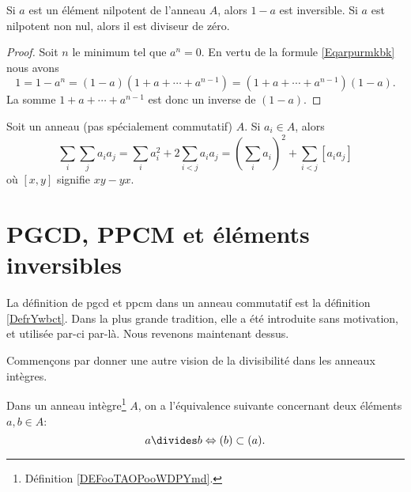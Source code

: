 \begin{proposition}
	Si \( a\) est un élément nilpotent de l'anneau \( A\), alors \( 1-a\) est inversible. Si \( a\) est nilpotent non nul, alors il est diviseur de zéro.
\end{proposition}

\begin{proof}
	Soit \( n\) le minimum tel que \( a^n=0\). En vertu de la formule \eqref{Eqarpurmkbk} nous avons
	\begin{equation}
		1=1-a^n=(1-a)(1+a+\cdots+a^{n-1})=(1+a+\cdots+a^{n-1})(1-a).
	\end{equation}
	La somme \( 1+a+\cdots+a^{n-1}\) est donc un inverse de \( (1-a)\).
\end{proof}

\begin{proposition}	\label{PROPooQMZMooBrQhhr}
	Soit un anneau (pas spécialement commutatif) \( A\). Si \( a_i\in A\), alors
	\begin{equation}
		\sum_i\sum_ja_ia_j=\sum_ia_i^2+2\sum_{i<j}a_ia_j=(\sum_ia_i)^2+\sum_{i<j}[a_ia_j]
	\end{equation}
	où \( [x,y]\) signifie \( xy-yx\).
\end{proposition}


\section{PGCD, PPCM et éléments inversibles}

La définition de pgcd et ppcm dans un anneau commutatif est la définition \ref{DefrYwbct}. Dans la plus grande tradition, elle a été introduite sans motivation, et utilisée par-ci par-là. Nous revenons maintenant dessus.

Commençons par donner une autre vision de la divisibilité dans les anneaux intègres.
\begin{proposition}\label{PropDiviseurIdeaux}
	Dans un anneau intègre\footnote{Définition \ref{DEFooTAOPooWDPYmd}.} \( A\), on a l'équivalence suivante concernant deux éléments \( a, b \in A \):
	\begin{equation}
		a\divides b\Leftrightarrow (b)\subset (a).
	\end{equation}
\end{proposition}

